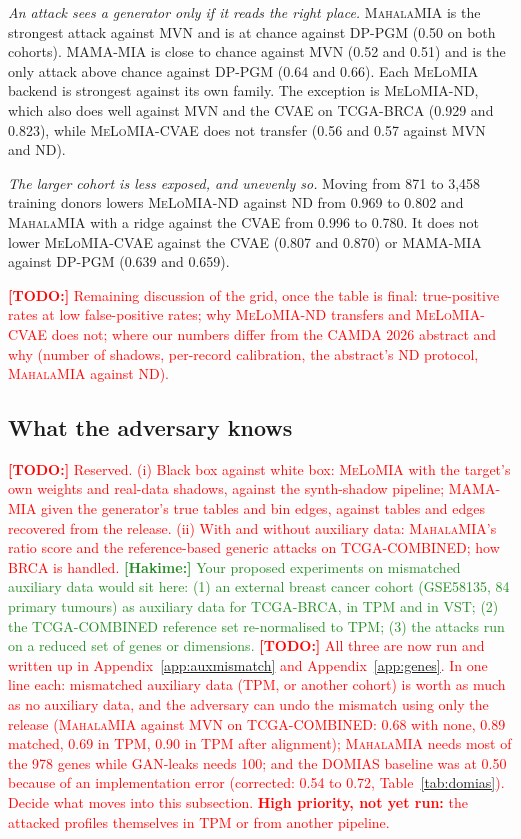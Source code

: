 \documentclass[webpdf,contemporary,large]{oup-authoring-template}
\newif\ifdraft \drafttrue
\newcommand{\annot}[3]{\ifdraft\textcolor{#1}{\textbf{[#2:]} #3}\fi}
\newcommand{\hakime}[1]{\annot{ForestGreen}{Hakime}{#1}}
\newcommand{\todo}[1]{\annot{red}{TODO}{#1}}
\newcommand{\mahala}{\textsc{MahalaMIA}}
\newcommand{\melo}{\textsc{MeLoMIA}}
\newcommand{\mama}{\textsc{MAMA-MIA}}
\begin{document}
\emph{An attack sees a generator only if it reads the right place.} \mahala{} is the strongest attack against MVN and is at chance against DP-PGM (0.50 on both cohorts). \mama{} is close to chance against MVN (0.52 and 0.51) and is the only attack above chance against DP-PGM (0.64 and 0.66). Each \melo{} backend is strongest against its own family. The exception is \melo{}-ND, which also does well against MVN and the CVAE on TCGA-BRCA (0.929 and 0.823), while \melo{}-CVAE does not transfer (0.56 and 0.57 against MVN and ND).

\emph{The larger cohort is less exposed, and unevenly so.} Moving from 871 to 3{,}458 training donors lowers \melo{}-ND against ND from 0.969 to 0.802 and \mahala{} with a ridge against the CVAE from 0.996 to 0.780. It does not lower \melo{}-CVAE against the CVAE (0.807 and 0.870) or \mama{} against DP-PGM (0.639 and 0.659).

\todo{Remaining discussion of the grid, once the table is final: true-positive rates at low false-positive rates; why \melo{}-ND transfers and \melo{}-CVAE does not; where our numbers differ from the CAMDA 2026 abstract and why (number of shadows, per-record calibration, the abstract's ND protocol, \mahala{} against ND).}

\subsection{What the adversary knows}
\label{sec:exp-threat}

\todo{Reserved. (i) Black box against white box: \melo{} with the target's own weights and real-data shadows, against the synth-shadow pipeline; \mama{} given the generator's true tables and bin edges, against tables and edges recovered from the release. (ii) With and without auxiliary data: \mahala{}'s ratio score and the reference-based generic attacks on TCGA-COMBINED; how BRCA is handled.}
\hakime{Your proposed experiments on mismatched auxiliary data would sit here: (1) an external breast cancer cohort (GSE58135, 84 primary tumours) as auxiliary data for TCGA-BRCA, in TPM and in VST; (2) the TCGA-COMBINED reference set re-normalised to TPM; (3) the attacks run on a reduced set of genes or dimensions.}
\todo{All three are now run and written up in Appendix~\ref{app:auxmismatch} and Appendix~\ref{app:genes}. In one line each: mismatched auxiliary data (TPM, or another cohort) is worth as much as no auxiliary data, and the adversary can undo the mismatch using only the release (\mahala{} against MVN on TCGA-COMBINED: 0.68 with none, 0.89 matched, 0.69 in TPM, 0.90 in TPM after alignment); \mahala{} needs most of the 978 genes while GAN-leaks needs 100; and the DOMIAS baseline was at 0.50 because of an implementation error (corrected: 0.54 to 0.72, Table~\ref{tab:domias}). Decide what moves into this subsection. \textbf{High priority, not yet run:} the attacked profiles themselves in TPM or from another pipeline.}
\end{document}
